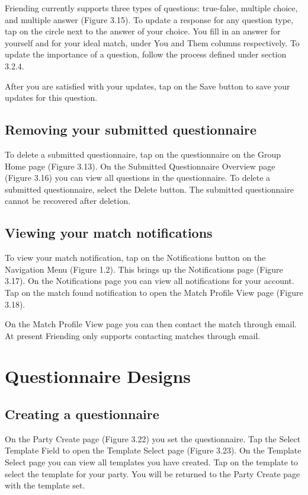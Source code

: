 \documentclass[a4paper,11pt,titlepage]{scrartcl}
\newcommand{\textapp}[1]{{\fontfamily{cmss}\selectfont#1}}
\newcommand{\Friending}{\textapp{Friending}}
\newcommand*{\fileNotifications}{notifications}
\newcommand*{\fileMatch}{match}
\newcommand*{\AssetsPath}{../assets}%
\newcommand{\appscreenshot}[4]{
}
\begin{document}
\Friending{} currently supports three types of questions: true-false, multiple choice, and multiple answer (Figure 3.15).  To update a response for any question type, tap on the circle next to the answer of your choice.  You fill in an answer for yourself and for your ideal match, under You and Them columns respectively.   To update the importance of a question, follow the process defined under section 3.2.4.

After you are satisfied with your updates, tap on the Save button to save your updates for this question. 

\subsection{Removing your submitted questionnaire}
\label{sec:questionnaire-submitted-delete}
To delete a submitted questionnaire, tap on the questionnaire on the Group Home page (Figure 3.13). On the Submitted Questionnaire Overview page (Figure 3.16) you can view all questions in the questionnaire.  To delete a submitted questionnaire, select the Delete button.  The submitted questionnaire cannot be recovered after deletion.

\subsection{Viewing your match notifications}
\label{sec:questionnaire-matches}

To view your match notification, tap on the Notifications button on the Navigation Menu (Figure 1.2). This brings up the Notifications page (Figure 3.17).  On the Notifications page you can view all notifications for your account.  Tap on the match found notification to open the Match Profile View page (Figure 3.18).  

On the Match Profile View page you can then contact the match through email.  At present \Friending{} only supports contacting matches through email.

\appscreenshot{\fileMatch}{Match}{View the profile of one of your match}{fig:match}
\appscreenshot{\fileNotifications}{Notifications}{Manage your incoming notifications}{fig:notifications}

\clearpage
\section{Questionnaire Designs}
\label{sec:admin}

\subsection{Creating a questionnaire}
\label{sec:questionnaire-create}
On the Party Create page (Figure 3.22) you set the questionnaire.  Tap the Select Template Field to open the Template Select page (Figure 3.23).  On the Template Select page you can view all templates you have created.  Tap on the template to select the template for your party.  You will be returned to the Party Create page with the template set.
\end{document}
